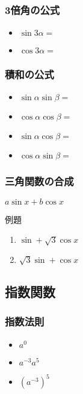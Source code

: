 \documentclass[10pt,dvipdfmx]{jsarticle}
\begin{document}
\subsubsection*{3倍角の公式}
\begin{multicols}{2}
  \begin{large}
    \begin{itemize}
      \item $\sin3\alpha=$
      \item $\cos3\alpha=$
    \end{itemize}
  \end{large}
\end{multicols}

\subsubsection*{積和の公式}
\begin{multicols}{2}
  \begin{large}
    \begin{itemize}
      \item $\sin\alpha\sin\beta=$
      \item $\cos\alpha\cos\beta=$
      \item $\sin\alpha\cos\beta=$
      \item $\cos\alpha\sin\beta=$
    \end{itemize}
  \end{large}
\end{multicols}

\subsubsection*{三角関数の合成}
$a\sin x+b\cos x$\vspace{10mm}
\begin{itembox}[l]{例題}
  \begin{large}
    \begin{enumerate}
      \item $\sin +\sqrt{3}\cos x$
      \item $\sqrt{3}\sin +\cos x$
    \end{enumerate}
  \end{large}
\end{itembox}

\newpage
\subsection*{指数関数}
\subsubsection*{指数法則}
\begin{multicols}{3}
  \begin{Large}
    \begin{itemize}
      \item $a^0$
      \item $a^{-3}a^5$
      \item $(a^{-3})^5$
    \end{itemize}
  \end{Large}
\end{multicols}
\end{document}
